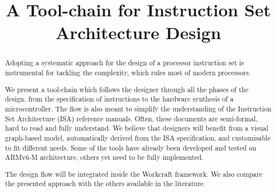 \documentclass[conference]{IEEEtran}
\begin{document}
\title{A Tool-chain for Instruction Set Architecture Design}

\author{
\and
{}
}


\maketitle

\begin{abstract}
Adopting a systematic approach for the design of a processor instruction set is instrumental for tackling the complexity, which rules most of modern processors.

We present a tool-chain which follows the designer through all the phases of the design, from the specification of instructions to the hardware synthesis of a microcontroller. The flow is also meant to simplify the understanding of the Instruction Set Architecture (ISA) reference manuals. Often, these documents are semi-formal, hard to read and fully understand. We believe that designers will benefit from a visual graph-based model, automatically derived from the ISA specification, and customisable to fit different needs. Some of the tools have already been developed and tested on ARMv6-M architecture, others yet need to be fully implemented.

The design flow will be integrated inside the Workcraft framework. We also compare the presented approach with the others available in the literature.
\end{abstract}


%
\IEEEpeerreviewmaketitle
\end{document}
